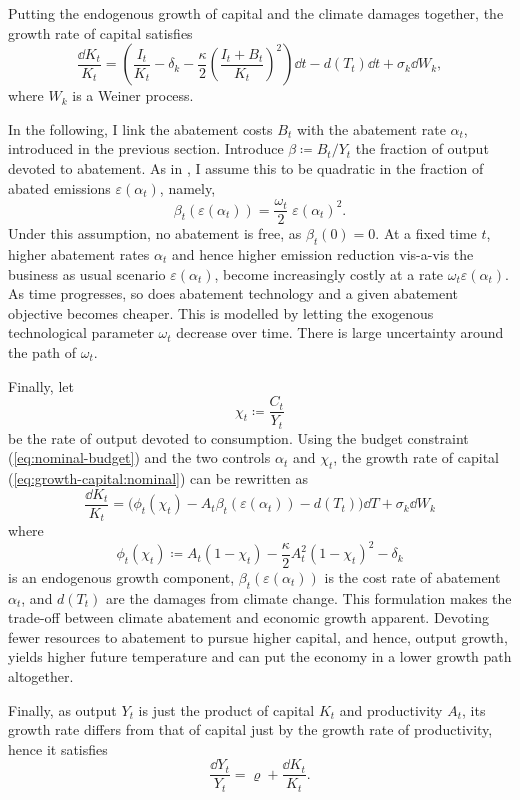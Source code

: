 \documentclass[../../main.tex]{subfiles}
\begin{document}
Putting the endogenous growth of capital and the climate damages together, the growth rate of capital satisfies \begin{equation} \label{eq:growth-capital:nominal}
    \frac{\dd{K}_t}{K_t} = \left(\frac{I_t}{K_t} - \delta_k - \frac{\kappa}{2} \left( \frac{I_t + B_t}{K_t} \right)^2 \right) \dd{t} - d(T_t) \dd{t} + \sigma_k \dd{W}_k,
\end{equation} where $W_k$ is a Weiner process.

In the following, I link the abatement costs $B_t$ with the abatement rate $\alpha_t$, introduced in the previous section. Introduce $\beta \coloneqq B_t / Y_t$ the fraction of output devoted to abatement. As in \cite{nordhaus_optimal_1992}, I assume this to be quadratic in the fraction of abated emissions $\varepsilon(\alpha_t)$, namely, \begin{equation} \label{eq:abatement-costs}
    \beta_t(\varepsilon(\alpha_t)) = \frac{\omega_t}{2} \; \varepsilon(\alpha_t)^2.
\end{equation} Under this assumption, no abatement is free, as $\beta_t(0) = 0$. At a fixed time $t$, higher abatement rates $\alpha_t$ and hence higher emission reduction vis-a-vis the business as usual scenario $\varepsilon(\alpha_t)$, become increasingly costly at a rate $\omega_t \varepsilon(\alpha_t)$. As time progresses, so does abatement technology and a given abatement objective becomes cheaper. This is modelled by letting the exogenous technological parameter $\omega_t$ decrease over time. There is large uncertainty around the path of $\omega_t$. %

Finally, let \begin{equation}
    \chi_t \coloneqq \frac{C_t}{Y_t}
\end{equation} be the rate of output devoted to consumption. Using the budget constraint (\ref{eq:nominal-budget}) and the two controls $\alpha_t$ and $\chi_t$, the growth rate of capital (\ref{eq:growth-capital:nominal}) can be rewritten as \begin{equation}
    \frac{\dd{K_t}}{K_t} = \Big(\phi_t(\chi_t) - A_t \beta_t(\varepsilon(\alpha_t)) - d(T_t) \Big) \dd{T} + \sigma_k \dd{W}_k
\end{equation} where \begin{equation}
    \phi_t(\chi_t) \coloneqq A_t (1 - \chi_t) - \frac{\kappa}{2} A_t^2 (1 - \chi_t)^2 - \delta_k
\end{equation} is an endogenous growth component, $\beta_t(\varepsilon(\alpha_t))$ is the cost rate of abatement $\alpha_t$, and $d(T_t)$ are the damages from climate change. This formulation makes the trade-off between climate abatement and economic growth apparent. Devoting fewer resources to abatement to pursue higher capital, and hence, output growth, yields higher future temperature and can put the economy in a lower growth path altogether.

Finally, as output $Y_t$ is just the product of capital $K_t$ and productivity $A_t$, its growth rate differs from that of capital just by the growth rate of productivity, hence it satisfies \begin{equation}
    \frac{\dd{Y}_t}{Y_t} = \varrho + \frac{\dd{K}_t}{K_t}. 
\end{equation}
\end{document}
